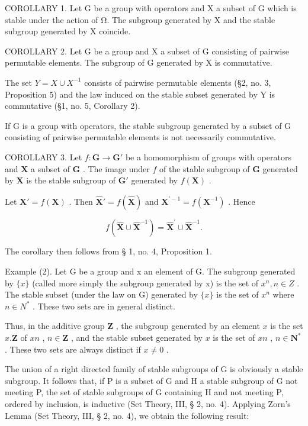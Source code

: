 COROLLARY 1. Let G be a group with operators and X a subset of G which is stable under the action of Ω. The subgroup generated by X and the stable subgroup generated by X coincide.

COROLLARY 2. Let G be a group and X a subset of G consisting of pairwise permutable elements. The subgroup of G generated by X is commutative.

The set \(Y = X \cup X^{-1}\) consists of pairwise permutable elements (§2, no. 3, Proposition 5) and the law induced on the stable subset generated by Y is commutative (§1, no. 5, Corollary 2).

If G is a group with operators, the stable subgroup generated by a subset of G consisting of pairwise permutable elements is not necessarily commutative.

COROLLARY 3. Let \(f: \mathbf{G} \to \mathbf{G}'\) be a homomorphism of groups with operators and \(\mathbf{X}\) a subset of \(\mathbf{G}\) . The image under \(f\) of the stable subgroup of \(\mathbf{G}\) generated by \(\mathbf{X}\) is the stable subgroup of \(\mathbf{G}'\) generated by \(f(\mathbf{X})\) .

Let \(\mathbf{X}' = f(\mathbf{X})\) . Then \(\hat{\mathbf{X}}' = f(\hat{\mathbf{X}})\) and \(\mathbf{X}^{\prime -1} = f(\mathbf{X}^{-1})\) . Hence

\[
f (\hat {\mathbf {X}} \cup \hat {\mathbf {X}} ^ {- 1}) = \hat {\mathbf {X}} ^ {\prime} \cup \hat {\mathbf {X}} ^ {- 1}.
\]

The corollary then follows from § 1, no. 4, Proposition 1.

Example (2). Let G be a group and x an element of G. The subgroup generated by \(\{x\}\) (called more simply the subgroup generated by x) is the set of \(x^{n}, n \in Z\) . The stable subset (under the law on G) generated by \(\{x\}\) is the set of \(x^{n}\) where \(n \in N^{*}\) . These two sets are in general distinct.

Thus, in the additive group \(\mathbf{Z}\) , the subgroup generated by an element \(x\) is the set \(x.\mathbf{Z}\) of \(xn\) , \(n \in \mathbf{Z}\) , and the stable subset generated by \(x\) is the set of \(xn\) , \(n \in \mathbf{N}^*\) . These two sets are always distinct if \(x \neq 0\) .

The union of a right directed family of stable subgroups of G is obviously a stable subgroup. It follows that, if P is a subset of G and H a stable subgroup of G not meeting P, the set of stable subgroups of G containing H and not meeting P, ordered by inclusion, is inductive (Set Theory, III, § 2, no. 4). Applying Zorn's Lemma (Set Theory, III, § 2, no. 4), we obtain the following result:


